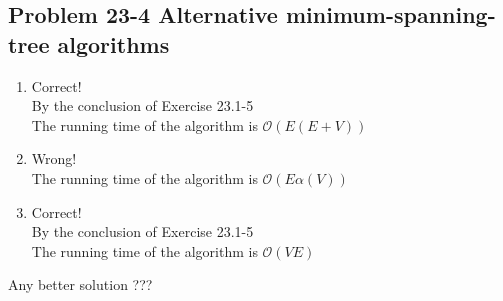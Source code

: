 \subsection*{Problem 23-4 Alternative minimum-spanning-tree algorithms}
\begin{enumerate}
	\item	Correct! \\
		By the conclusion of Exercise 23.1-5 \\
		The running time of the algorithm is $\mathcal{O}(E(E + V))$
	\item	Wrong! \\
		The running time of the algorithm is $\mathcal{O}(E\alpha(V))$
	\item	Correct! \\
		By the conclusion of Exercise 23.1-5 \\
		The running time of the algorithm is $\mathcal{O}(VE)$
\end{enumerate}
Any better solution ???

